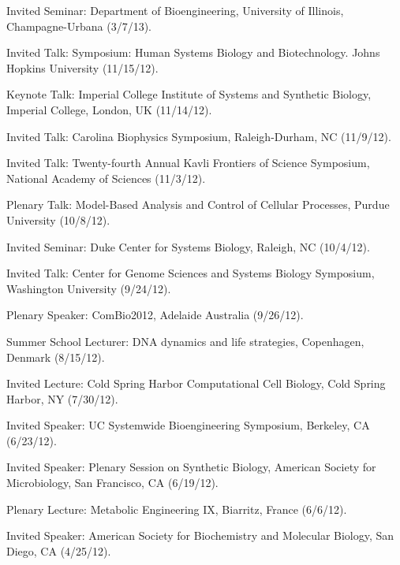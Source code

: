  \item Invited Seminar: Department of Bioengineering, University of Illinois, Champagne-Urbana (3/7/13).
 
 \item Invited Talk: Symposium: Human Systems Biology and Biotechnology. Johns Hopkins University (11/15/12).

\item Keynote Talk: Imperial College Institute of Systems and Synthetic Biology, Imperial College, London, UK (11/14/12).

\item Invited Talk: Carolina Biophysics Symposium, Raleigh-Durham, NC (11/9/12).

\item Invited Talk: Twenty-fourth Annual Kavli Frontiers of Science Symposium, National Academy of Sciences (11/3/12).

\item Plenary Talk: Model-Based Analysis and Control of Cellular Processes, Purdue University (10/8/12).

\item Invited Seminar: Duke Center for Systems Biology, Raleigh, NC (10/4/12).

\item Invited Talk: Center for Genome Sciences and Systems Biology Symposium, Washington University (9/24/12).

\item Plenary Speaker: ComBio2012, Adelaide Australia (9/26/12).

\item Summer School Lecturer: DNA dynamics and life strategies, Copenhagen, Denmark (8/15/12).

\item Invited Lecture: Cold Spring Harbor Computational Cell Biology, Cold Spring Harbor, NY (7/30/12). 

\item Invited Speaker: UC Systemwide Bioengineering Symposium, Berkeley, CA (6/23/12). 

\item Invited Speaker: Plenary Session on Synthetic Biology, American Society for Microbiology, San Francisco, CA (6/19/12). 

\item Plenary Lecture: Metabolic Engineering IX, Biarritz, France (6/6/12). 

\item Invited Speaker: American Society for Biochemistry and Molecular Biology, San Diego, CA (4/25/12). 

